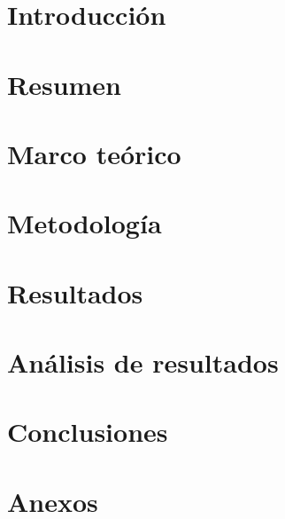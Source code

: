 \documentclass{article}
\begin{document}

\tableofcontents
\newpage

\section{Introducción}



\section{Resumen}

\section{Marco teórico}



\section{Metodología}

\section{Resultados}

\section{Análisis de resultados}

\section{Conclusiones}

\section{Anexos}

\end{document}
